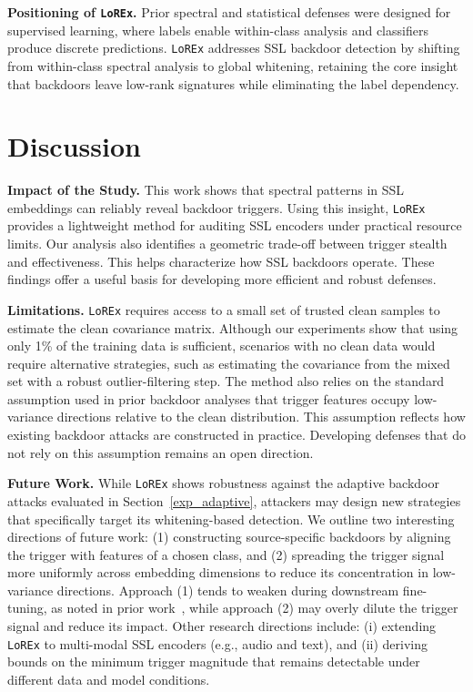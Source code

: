 \documentclass[letterpaper,twocolumn,10pt]{article}
\begin{document}
\par \textbf{Positioning of \texttt{LoREx}.}
Prior spectral and statistical defenses were designed for supervised learning, where labels enable within-class analysis and classifiers produce discrete predictions. \texttt{LoREx} addresses SSL backdoor detection by shifting from within-class spectral analysis to global whitening, retaining the core insight that backdoors leave low-rank signatures while eliminating the label dependency.

\section{Discussion}
\label{Section8}

\par \textbf{Impact of the Study.} This work shows that spectral patterns in SSL embeddings can reliably reveal backdoor triggers. Using this insight, \texttt{LoREx} provides a lightweight method for auditing SSL encoders under practical resource limits. Our analysis also identifies a geometric trade-off between trigger stealth and effectiveness. This helps characterize how SSL backdoors operate. These findings offer a useful basis for developing more efficient and robust defenses. 

\par \textbf{Limitations.}
\texttt{LoREx} requires access to a small set of trusted clean samples to estimate the clean covariance matrix. Although our experiments show that using only 1\% of the training data is sufficient, scenarios with no clean data would require alternative strategies, such as estimating the covariance from the mixed set with a robust outlier-filtering step. The method also relies on the standard assumption used in prior backdoor analyses that trigger features occupy low-variance directions relative to the clean distribution. This assumption reflects how existing backdoor attacks are constructed in practice. Developing defenses that do not rely on this assumption remains an open direction.


\par \textbf{Future Work.} While \texttt{LoREx} shows robustness against the adaptive backdoor attacks evaluated in Section~\ref{exp_adaptive}, attackers may design new strategies that specifically target its whitening-based detection. We outline two interesting directions of future work: (1) constructing source-specific backdoors by aligning the trigger with features of a chosen class, and (2) spreading the trigger signal more uniformly across embedding dimensions to reduce its concentration in low-variance directions. Approach (1) tends to weaken during downstream fine-tuning, as noted in prior work~\cite{hou2025dede}, while approach (2) may overly dilute the trigger signal and reduce its impact. Other research directions include: (i) extending \texttt{LoREx} to multi-modal SSL encoders (e.g., audio and text), and (ii) deriving bounds on the minimum trigger magnitude that remains detectable under different data and model conditions.
\end{document}
